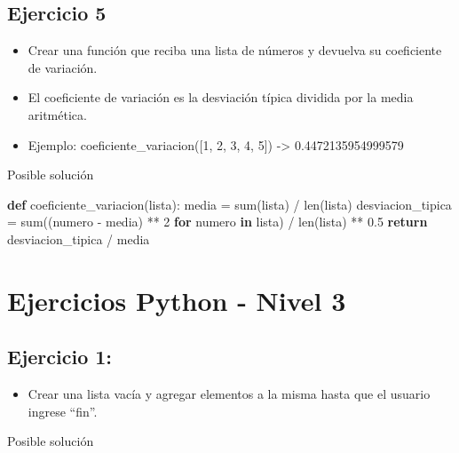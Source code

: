 \documentclass[
  a4paper,
  DIV=11,
  numbers=noendperiod,
  onepage,
  openany]{scrreprt}
\newenvironment{Shaded}{\begin{snugshade}}{\end{snugshade}}
\newcommand{\BuiltInTok}[1]{\textcolor[rgb]{0.00,0.23,0.31}{#1}}
\newcommand{\ControlFlowTok}[1]{\textcolor[rgb]{0.00,0.23,0.31}{\textbf{#1}}}
\newcommand{\DecValTok}[1]{\textcolor[rgb]{0.68,0.00,0.00}{#1}}
\newcommand{\FloatTok}[1]{\textcolor[rgb]{0.68,0.00,0.00}{#1}}
\newcommand{\KeywordTok}[1]{\textcolor[rgb]{0.00,0.23,0.31}{\textbf{#1}}}
\newcommand{\NormalTok}[1]{\textcolor[rgb]{0.00,0.23,0.31}{#1}}
\newcommand{\OperatorTok}[1]{\textcolor[rgb]{0.37,0.37,0.37}{#1}}
\providecommand{\tightlist}{%
  \setlength{\itemsep}{0pt}\setlength{\parskip}{0pt}}\usepackage{longtable,booktabs,array}
\begin{document}
\begin{tcolorbox}
\section{Ejercicio 5}\label{ejercicio-5-2}

\begin{itemize}
\tightlist
\item
  Crear una función que reciba una lista de números y devuelva su
  coeficiente de variación.
\item
  El coeficiente de variación es la desviación típica dividida por la
  media aritmética.
\item
  Ejemplo: coeficiente\_variacion({[}1, 2, 3, 4, 5{]}) -\textgreater{}
  0.4472135954999579
\end{itemize}

Posible solución

\begin{Shaded}
\begin{Highlighting}[]
\KeywordTok{def}\NormalTok{ coeficiente\_variacion(lista):}
\NormalTok{    media }\OperatorTok{=} \BuiltInTok{sum}\NormalTok{(lista) }\OperatorTok{/} \BuiltInTok{len}\NormalTok{(lista)}
\NormalTok{    desviacion\_tipica }\OperatorTok{=} \BuiltInTok{sum}\NormalTok{((numero }\OperatorTok{{-}}\NormalTok{ media) }\OperatorTok{**} \DecValTok{2} \ControlFlowTok{for}\NormalTok{ numero }\KeywordTok{in}\NormalTok{ lista) }\OperatorTok{/} \BuiltInTok{len}\NormalTok{(lista) }\OperatorTok{**} \FloatTok{0.5}
    \ControlFlowTok{return}\NormalTok{ desviacion\_tipica }\OperatorTok{/}\NormalTok{ media}
\end{Highlighting}
\end{Shaded}

\chapter{Ejercicios Python - Nivel 3}\label{ejercicios-python---nivel-3}

\section{Ejercicio 1:}\label{ejercicio-1-4}

\begin{itemize}
\tightlist
\item
  Crear una lista vacía y agregar elementos a la misma hasta que el
  usuario ingrese ``fin''.
\end{itemize}

Posible solución


\end{tcolorbox}
\end{document}
